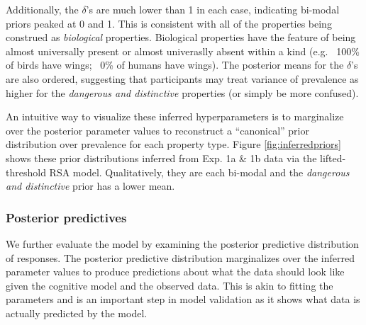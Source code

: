 \documentclass[10pt,letterpaper]{article}
\begin{document}
Additionally, the $\delta$'s are much lower than 1 in each case, indicating bi-modal priors peaked at 0 and 1. This is consistent with all of the properties being construed as \emph{biological} properties. Biological properties have the feature of being almost universally present or almost univeraslly absent within a kind (e.g. ~100\% of birds have wings; ~0\% of humans have wings). The posterior means for the $\delta$'s are also ordered, suggesting that participants may treat variance of prevalence as higher for the \emph{dangerous and distinctive} properties (or simply be more confused).

An intuitive way to visualize these inferred hyperparameters is to marginalize over the posterior parameter values to reconstruct a ``canonical'' prior distribution over prevalence for each property type. Figure \ref{fig:inferredpriors} shows these prior distributions inferred from Exp. 1a \& 1b data via the lifted-threshold RSA model. 
Qualitatively, they are each bi-modal and the \emph{dangerous and distinctive} prior has a lower mean.



%



\subsubsection{Posterior predictives}

We further evaluate the model by examining the posterior predictive distribution of responses. The posterior predictive distribution marginalizes over the inferred parameter values to produce predictions about what the data should look like given the cognitive model and the observed data. This is akin to fitting the parameters and is an important step in model validation as it shows what data is actually predicted by the model.
\end{document}
